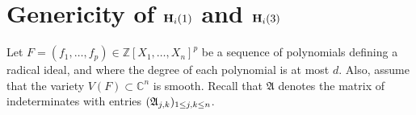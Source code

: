 \documentclass[12pt]{article}
\def\A{\mathfrak{A}}
\def\mA{{\bm A}}
\def\ub{{\bm u}}
\def\lb{{\bm l}}
\def\xb{{\bm x}}
\def\D{\Delta}
\newcommand{\ZZ}{{\mathbb{Z}}}
\def\C{\mathbb{C}}
\newtheorem{theorem}{Theorem}[section]
\begin{document}


\section{Genericity of ${\bf H}_i(1)$ and ${\bf H}_i(3)$}
\label{sec:applications}

Let $F=(f_1,\hdots,f_p) \in \ZZ[X_1,\hdots,X_n]^p$ be a sequence of
polynomials defining a radical ideal, and where the degree of each
polynomial is at most $d$. Also, assume that the variety $V(F) \subset
\C^n$ is smooth. Recall that $\A$ denotes the matrix of indeterminates
with entries $(\frak A_{j,k})_{1\le j,k \le n}$.
\end{document}
